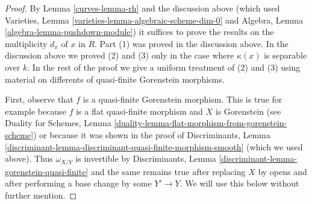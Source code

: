 \begin{proof}

By Lemma \ref{curves-lemma-rh} and the discussion above
(which used
Varieties, Lemma \ref{varieties-lemma-algebraic-scheme-dim-0}
and
Algebra, Lemma \ref{algebra-lemma-pushdown-module})
it suffices to prove the results on the
multiplicity $d_x$ of $x$ in $R$. Part (1) was proved
in the discussion above. In the discussion above
we proved (2) and (3) only in the case where $\kappa(x)$ is
separable over $k$.
In the rest of the proof we give a uniform treatment
of (2) and (3) using material on differents of
quasi-finite Gorenstein morphisms.

\medskip\noindent
First, observe that $f$ is a quasi-finite Gorenstein morphism.
This is true for example because
$f$ is a flat quasi-finite morphism and $X$ is Gorenstein
(see Duality for Schemes, Lemma
\ref{duality-lemma-flat-morphism-from-gorenstein-scheme})
or because it was shown in the proof of
Discriminants, Lemma
\ref{discriminant-lemma-discriminant-quasi-finite-morphism-smooth}
(which we used above). Thus $\omega_{X/Y}$ is invertible by
Discriminants, Lemma \ref{discriminant-lemma-gorenstein-quasi-finite}
and the same remains true after replacing $X$ by opens and after
performing a base change by some $Y' \to Y$. We will use this
below without further mention.


\end{proof}
